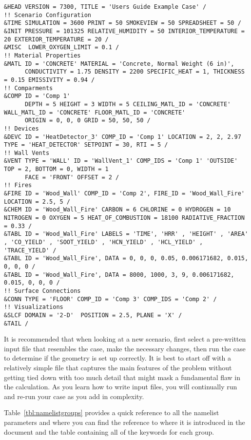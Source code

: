 \begin{lstlisting}[basicstyle=\tiny]
&HEAD VERSION = 7300, TITLE = 'Users Guide Example Case' /
!! Scenario Configuration
&TIME SIMULATION = 3600 PRINT = 50 SMOKEVIEW = 50 SPREADSHEET = 50 /
&INIT PRESSURE = 101325 RELATIVE_HUMIDITY = 50 INTERIOR_TEMPERATURE = 20 EXTERIOR_TEMPERATURE = 20 /
&MISC  LOWER_OXYGEN_LIMIT = 0.1 /
!! Material Properties
&MATL ID = 'CONCRETE' MATERIAL = 'Concrete, Normal Weight (6 in)',
      CONDUCTIVITY = 1.75 DENSITY = 2200 SPECIFIC_HEAT = 1, THICKNESS = 0.15 EMISSIVITY = 0.94 /
!! Comparments
&COMP ID = 'Comp 1'
      DEPTH = 5 HEIGHT = 3 WIDTH = 5 CEILING_MATL_ID = 'CONCRETE' WALL_MATL_ID = 'CONCRETE' FLOOR_MATL_ID = 'CONCRETE'
      ORIGIN = 0, 0, 0 GRID = 50, 50, 50 /
!! Devices
&DEVC ID = 'HeatDetector_3' COMP_ID = 'Comp 1' LOCATION = 2, 2, 2.97 TYPE = 'HEAT_DETECTOR' SETPOINT = 30, RTI = 5 /
!! Wall Vents
&VENT TYPE = 'WALL' ID = 'WallVent_1' COMP_IDS = 'Comp 1' 'OUTSIDE'  TOP = 2, BOTTOM = 0, WIDTH = 1
      FACE = 'FRONT' OFFSET = 2 /
!! Fires
&FIRE ID = 'Wood_Wall' COMP_ID = 'Comp 2', FIRE_ID = 'Wood_Wall_Fire'  LOCATION = 2.5, 5 /
&CHEM ID = 'Wood_Wall_Fire' CARBON = 6 CHLORINE = 0 HYDROGEN = 10 NITROGEN = 0 OXYGEN = 5 HEAT_OF_COMBUSTION = 18100 RADIATIVE_FRACTION = 0.33 /
&TABL ID = 'Wood_Wall_Fire' LABELS = 'TIME', 'HRR' , 'HEIGHT' , 'AREA' , 'CO_YIELD' , 'SOOT_YIELD' , 'HCN_YIELD' , 'HCL_YIELD' , 'TRACE_YIELD' /
&TABL ID = 'Wood_Wall_Fire', DATA = 0, 0, 0, 0.05, 0.006171682, 0.015, 0, 0, 0 /
&TABL ID = 'Wood_Wall_Fire', DATA = 8000, 1000, 3, 9, 0.006171682, 0.015, 0, 0, 0 /
!! Surface Connections
&CONN TYPE = 'FLOOR' COMP_ID = 'Comp 3' COMP_IDS = 'Comp 2' /
!! Visualizations
&SLCF DOMAIN = '2-D'  POSITION = 2.5, PLANE = 'X' /
&TAIL /

\end{lstlisting}
It is recommended that when looking at a new scenario, first select a pre-written input file that resembles the case, make the necessary changes, then run the case to determine if the geometry is set up correctly. It is best to start off with a relatively simple file that captures the main features of the problem without getting tied down with too much detail that might mask a fundamental flaw in the calculation. As you learn how to write input files, you will continually run and re-run your case as you add in complexity.

Table~\ref{tbl:namelistgroups} provides a quick reference to all the namelist parameters and where you can find the reference to where it is introduced in the document and the table containing all of the keywords for each group.


